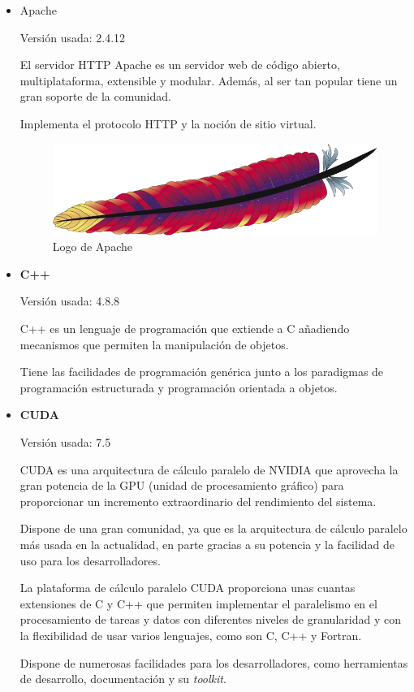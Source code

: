 \begin{itemize}
	\item Apache
	
		Versión usada: 2.4.12
		
		El servidor HTTP Apache \cite{apache} es un servidor web de código abierto, multiplataforma, extensible y modular. Además, al ser tan popular tiene un gran soporte de la comunidad.
		
		Implementa el protocolo HTTP y la noción de sitio virtual. 
		

		\bigskip
		\begin{figure}[h]
			\centering
			\includegraphics[width=0.4\linewidth]{../images/apachelogo}
			\caption[Logo de Apache]{Logo de Apache}
			\label{fig:apachelogo}
		\end{figure}
				
	\item \textbf{C++}
	
	Versión usada: 4.8.8
	
	C++ \cite{cpp} es un lenguaje de programación que extiende a C añadiendo mecanismos que permiten la manipulación de objetos. 
	
	Tiene las facilidades de programación genérica junto a los paradigmas de programación estructurada y programación orientada a objetos. 
		 
	
	\item \textbf{CUDA}
	
	Versión usada: 7.5
	
	CUDA \cite{nvidiacuda} es una arquitectura de cálculo paralelo de NVIDIA que aprovecha la gran potencia de la GPU (unidad de procesamiento gráfico) para proporcionar un incremento extraordinario del rendimiento del sistema.
	
	Dispone de una gran comunidad, ya que es la arquitectura de cálculo paralelo más usada en la actualidad, en parte gracias a su potencia y la facilidad de uso para los desarrolladores.

	
	La plataforma de cálculo paralelo CUDA proporciona unas cuantas extensiones de C y C++ que permiten implementar el paralelismo en el procesamiento de tareas y datos con diferentes niveles de granularidad y con la flexibilidad de usar varios lenguajes, como son C, C++ y Fortran. 
	
	Dispone de numerosas facilidades para los desarrolladores, como herramientas de desarrollo, documentación y su \textit{toolkit}.


\end{itemize}
